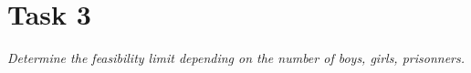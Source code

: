 \section{Task 3}
\label{sec:task3}
\textit{Determine the feasibility limit depending on the number of boys, girls, prisonners.}